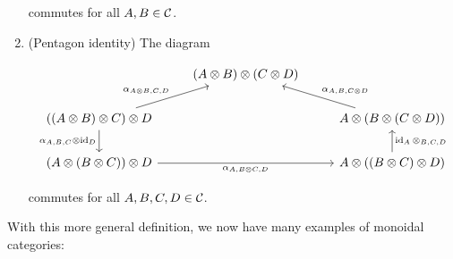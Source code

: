 \begin{defn}
\begin{enumerate}
commutes for all $A,B\in {\mathcal C}$.

\item (Pentagon identity) The diagram

\[\begin{tikzcd}
	& {(A\otimes B)\otimes(C\otimes D)} \\
	{((A\otimes B)\otimes C)\otimes D} && {A\otimes (B\otimes (C\otimes D))} \\
	{(A\otimes (B\otimes C))\otimes D} && {A\otimes((B\otimes C)\otimes D)}
	\arrow["{\alpha_{A\otimes B, C,D}}", from=2-1, to=1-2]
	\arrow["{\alpha_{A,B,{C\otimes D}}}"', from=2-3, to=1-2]
	\arrow["{\alpha_{A,B,C}\otimes \id_D}"', from=2-1, to=3-1]
	\arrow["{\id_A\otimes_{B,C,D}}"', from=3-3, to=2-3]
	\arrow["{\alpha_{A,B\otimes C,D}}"', from=3-1, to=3-3]
\end{tikzcd}\]

commutes for all $A,B,C,D\in {\mathcal C}$.
\end{enumerate}


\end{defn}

With this more general definition, we now have many examples of monoidal categories:

